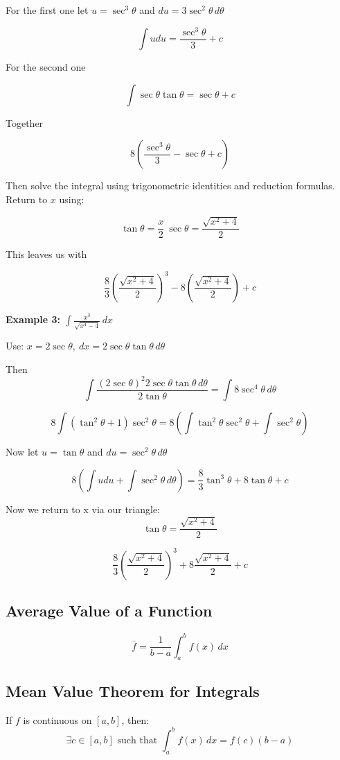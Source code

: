 For the first one let \(u = \sec^3\theta\) and \(du = 3\sec^2\theta\,d\theta\) 

\[
\int udu = \frac{\sec^3\theta}{3} + c
\]

For the second one

\[
\int \sec\theta\tan\theta = \sec\theta + c
\]

Together

\[8\left(  \frac{\sec^3\theta}{3} - \sec\theta + c\right)\]

Then solve the integral using trigonometric identities and reduction formulas. Return to \( x \) using:

\[
\tan\theta = \frac{x}{2}\ \sec\theta = \frac{\sqrt{x^2 + 4}}{2}
\]

This leaves us with

\[
    \frac{8}{3} {\left(\frac{\sqrt{x^2 + 4}}{2}\right)}^3 - 8 \left( \frac{\sqrt{x^2 + 4}}{2}\right) + c
\]

\textbf{Example 3: \( \int \frac{x^3}{\sqrt{x^4 - 4}} \,dx \)}

Use: \(x = 2\sec \theta, \ dx = 2\sec \theta \tan \theta \,d\theta \)

Then
\[
\int \frac{{(2\sec\theta)}^2 2\sec\theta \tan\theta \,d\theta}{2\tan\theta} = \int 8\sec^4 \theta\,d\theta
\]

\[
8\int(\tan^2\theta + 1)\sec^2\theta = 8\left(\int\tan^2\theta\sec^2\theta + \int \sec^2\theta \right)
\]

Now let \(u = \tan\theta\) and \(du = \sec^2\theta \,d\theta\)

\[
8\left( \int udu  + \int \sec^2\theta\,d\theta\right) = 
\frac{8}{3}\tan^3\theta + 8\tan\theta + c
\]

Now we return to x via our triangle:
\[\tan\theta = \frac{\sqrt{x^2 + 4}}{2}\]

\[
\frac{8}{3}{\left(\frac{\sqrt{x^2 + 4}}{2}\right)}^3 + 8 \frac{\sqrt{x^2 + 4}}{2} + c
\]
\subsection{Average Value of a Function}

\[
\bar{f} = \frac{1}{b - a} \int_a^b f(x)\,dx
\]

\subsection{Mean Value Theorem for Integrals}

If \(f\) is continuous on \([a, b]\), then:
\[
\exists c \in [a, b] \text{ such that } \int_a^b f(x)\,dx = f(c)(b - a)
\]

